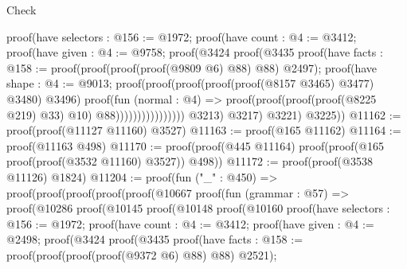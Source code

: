 \begin{lexlean}{Check}
\begin{coremodule}
                                  proof(have selectors : @156 := @1972;
                                    proof(have count : @4 := @3412;
                                      proof(have given : @4 := @9758;
                                        proof(@3424
                                            proof(@3435
                                                proof(have facts : @158 := proof(proof(proof(proof(@9809
                                                            @6)
                                                          @88)
                                                        @88)
                                                      @2497);
                                                  proof(have shape : @4 := @9013;
                                                    proof(proof(proof(proof(proof(@8157 @3465)
                                                              @3477)
                                                            @3480)
                                                          @3496)
                                                        proof(fun (normal : @4) =>
                                                          proof(proof(proof(proof(@8225 @219) @33)
                                                                @10)
                                                              @88))))))))))))))))
              @3213)
            @3217)
          @3221)
        @3225))
@11162 := proof(proof(@11127 @11160) @3527)
@11163 := proof(@165 @11162)
@11164 := proof(@11163 @498)
@11170 := proof(proof(@445 @11164) proof(proof(@165 proof(proof(@3532 @11160) @3527)) @498))
@11172 := proof(proof(@3538 @11126) @1824)
@11204 := proof(fun ("_" : @450) =>
    proof(proof(proof(proof(proof(@10667
                proof(fun (grammar : @57) =>
                  proof(@10286
                      proof(@10145
                          proof(@10148
                              proof(@10160
                                  proof(have selectors : @156 := @1972;
                                    proof(have count : @4 := @3412;
                                      proof(have given : @4 := @2498;
                                        proof(@3424
                                            proof(@3435
                                                proof(have facts : @158 := proof(proof(proof(proof(@9372
                                                            @6)
                                                          @88)
                                                        @88)
                                                      @2521);

\end{coremodule}
\end{lexlean}

